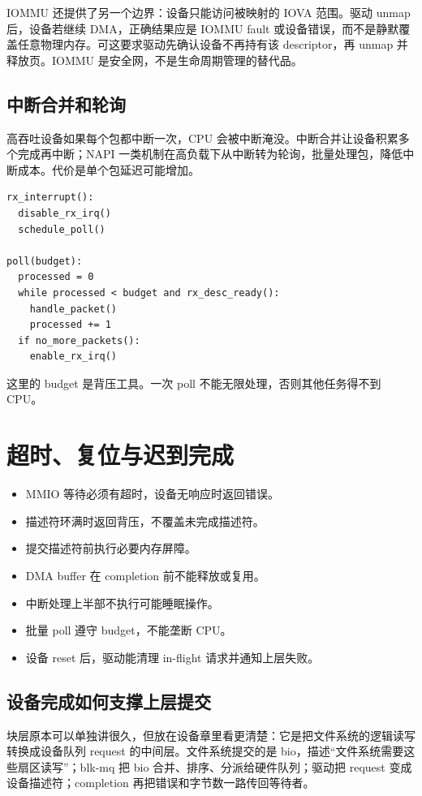 IOMMU 还提供了另一个边界：设备只能访问被映射的 IOVA 范围。驱动 unmap 后，设备若继续 DMA，正确结果应是 IOMMU fault 或设备错误，而不是静默覆盖任意物理内存。可这要求驱动先确认设备不再持有该 descriptor，再 unmap 并释放页。IOMMU 是安全网，不是生命周期管理的替代品。

\subsection{中断合并和轮询}

高吞吐设备如果每个包都中断一次，CPU 会被中断淹没。中断合并让设备积累多个完成再中断；NAPI 一类机制在高负载下从中断转为轮询，批量处理包，降低中断成本。代价是单个包延迟可能增加。

\begin{lstlisting}
rx_interrupt():
  disable_rx_irq()
  schedule_poll()

poll(budget):
  processed = 0
  while processed < budget and rx_desc_ready():
    handle_packet()
    processed += 1
  if no_more_packets():
    enable_rx_irq()
\end{lstlisting}

这里的 budget 是背压工具。一次 poll 不能无限处理，否则其他任务得不到 CPU。

\section{超时、复位与迟到完成}

\begin{itemize}
\tightlist
\item MMIO 等待必须有超时，设备无响应时返回错误。
\item 描述符环满时返回背压，不覆盖未完成描述符。
\item 提交描述符前执行必要内存屏障。
\item DMA buffer 在 completion 前不能释放或复用。
\item 中断处理上半部不执行可能睡眠操作。
\item 批量 poll 遵守 budget，不能垄断 CPU。
\item 设备 reset 后，驱动能清理 in-flight 请求并通知上层失败。
\end{itemize}

\subsection{设备完成如何支撑上层提交}

块层原本可以单独讲很久，但放在设备章里看更清楚：它是把文件系统的逻辑读写转换成设备队列 request 的中间层。文件系统提交的是 bio，描述“文件系统需要这些扇区读写”；blk-mq 把 bio 合并、排序、分派给硬件队列；驱动把 request 变成设备描述符；completion 再把错误和字节数一路传回等待者。

